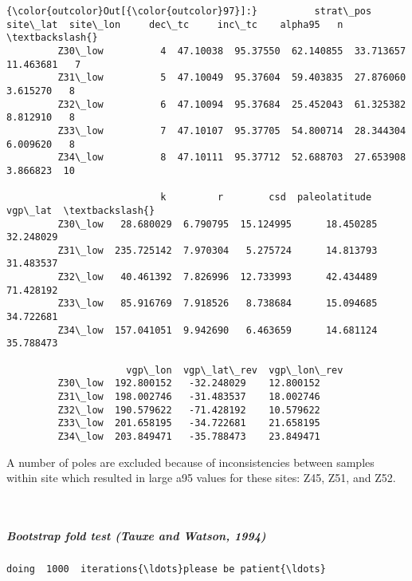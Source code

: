 \documentclass[11pt]{article}
\begin{document}
            \begin{Verbatim}[commandchars=\\\{\}]
{\color{outcolor}Out[{\color{outcolor}97}]:}          strat\_pos  site\_lat  site\_lon     dec\_tc     inc\_tc    alpha95   n  \textbackslash{}
         Z30\_low          4  47.10038  95.37550  62.140855  33.713657  11.463681   7   
         Z31\_low          5  47.10049  95.37604  59.403835  27.876060   3.615270   8   
         Z32\_low          6  47.10094  95.37684  25.452043  61.325382   8.812910   8   
         Z33\_low          7  47.10107  95.37705  54.800714  28.344304   6.009620   8   
         Z34\_low          8  47.10111  95.37712  52.688703  27.653908   3.866823  10   
         
                           k         r        csd  paleolatitude    vgp\_lat  \textbackslash{}
         Z30\_low   28.680029  6.790795  15.124995      18.450285  32.248029   
         Z31\_low  235.725142  7.970304   5.275724      14.813793  31.483537   
         Z32\_low   40.461392  7.826996  12.733993      42.434489  71.428192   
         Z33\_low   85.916769  7.918526   8.738684      15.094685  34.722681   
         Z34\_low  157.041051  9.942690   6.463659      14.681124  35.788473   
         
                     vgp\_lon  vgp\_lat\_rev  vgp\_lon\_rev  
         Z30\_low  192.800152   -32.248029    12.800152  
         Z31\_low  198.002746   -31.483537    18.002746  
         Z32\_low  190.579622   -71.428192    10.579622  
         Z33\_low  201.658195   -34.722681    21.658195  
         Z34\_low  203.849471   -35.788473    23.849471  
\end{Verbatim}
        
    A number of poles are excluded because of inconsistencies between
samples within site which resulted in large a95 values for these sites:
Z45, Z51, and Z52.



    \begin{center}
    \end{center}
    { \hspace*{\fill} \\}
    
    \subparagraph{Bootstrap fold test (Tauxe and Watson,
1994)}\label{bootstrap-fold-test-tauxe-and-watson-1994}


    \begin{Verbatim}[commandchars=\\\{\}]
doing  1000  iterations{\ldots}please be patient{\ldots}
    \end{Verbatim}
\end{document}
